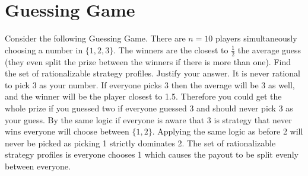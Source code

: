 \documentclass{article}
\begin{document}
\section{Guessing Game}
Consider the following Guessing Game.
There are $n = 10$ players simultaneously choosing a number in $\{1,2,3\}$.
The winners are the closest to $\frac{1}{2}$ the average guess (they even split the prize between the winners if there is more than one).
Find the set of rationalizable strategy profiles. Justify your answer.
\newline
\newline
It is never rational to pick 3 as your number. If everyone picks 3 then the average will be 3 as well, and the winner will be the player closest to 1.5.
Therefore you could get the whole prize if you guessed two if everyone guessed 3 and should never pick 3 as your guess.
By the same logic if everyone is aware that 3 is strategy that never wins  everyone will choose between $\{1,2\}$.
Applying the same logic as before 2 will never be picked as picking 1 strictly dominates 2.
The set of rationalizable strategy profiles is everyone chooses 1 which causes the payout to be split evenly between everyone.
\end{document}
